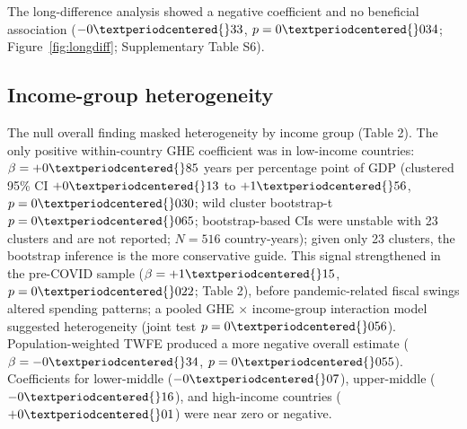 \documentclass[12pt,a4paper]{article}
\begin{document}
The long-difference analysis showed a negative coefficient and no
beneficial association ($-0{\textperiodcentered{}}33$, $p = 0{\textperiodcentered{}}034$;
Figure~\ref{fig:longdiff}; Supplementary Table S6). \subsection*{Income-group heterogeneity}

The null overall finding masked heterogeneity by income group (Table 2). The only positive within-country GHE coefficient was in low-income countries: $\beta = +0{\textperiodcentered{}}85$ years per percentage point of GDP (clustered 95\% CI $+0{\textperiodcentered{}}13$ to $+1{\textperiodcentered{}}56$, $p = 0{\textperiodcentered{}}030$; wild cluster bootstrap-t $p = 0{\textperiodcentered{}}065$; bootstrap-based CIs were unstable with 23 clusters and are not reported; $N = 516$ country-years); given only 23 clusters, the bootstrap inference is the more conservative guide. This signal strengthened in the pre-COVID sample ($\beta = +1{\textperiodcentered{}}15$, $p = 0{\textperiodcentered{}}022$; Table 2), before pandemic-related fiscal swings altered spending patterns; a pooled GHE $\times$ income-group interaction model suggested heterogeneity (joint test $p = 0{\textperiodcentered{}}056$). Population-weighted TWFE produced a more negative overall estimate ($\beta = -0{\textperiodcentered{}}34$, $p = 0{\textperiodcentered{}}055$). Coefficients for lower-middle ($-0{\textperiodcentered{}}07$), upper-middle ($-0{\textperiodcentered{}}16$), and high-income countries ($+0{\textperiodcentered{}}01$) were near zero or negative.
\end{document}
